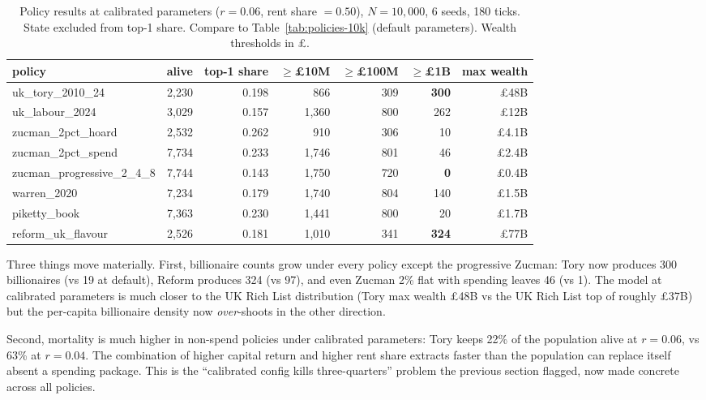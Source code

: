 \documentclass[11pt]{article}
\begin{document}
\begin{table}[t]
\centering
\small
\caption{Policy results at calibrated parameters ($r=0.06$, rent
share $=0.50$), $N=10{,}000$, 6 seeds, 180 ticks. State excluded
from top-1 share. Compare to Table~\ref{tab:policies-10k}
(default parameters). Wealth thresholds in \pounds.}
\label{tab:policies-calibrated}
\begin{tabular}{lrrrrrr}
\toprule
policy & alive & top-1 share & $\geq$\pounds10M & $\geq$\pounds100M & $\geq$\pounds1B & max wealth \\
\midrule
uk\_tory\_2010\_24 & 2{,}230 & 0.198 & 866 & 309 & \textbf{300} & \pounds48B \\
uk\_labour\_2024 & 3{,}029 & 0.157 & 1{,}360 & 800 & 262 & \pounds12B \\
zucman\_2pct\_hoard & 2{,}532 & 0.262 & 910 & 306 & 10 & \pounds4.1B \\
zucman\_2pct\_spend & 7{,}734 & 0.233 & 1{,}746 & 801 & 46 & \pounds2.4B \\
zucman\_progressive\_2\_4\_8 & 7{,}744 & 0.143 & 1{,}750 & 720 & \textbf{0} & \pounds0.4B \\
warren\_2020 & 7{,}234 & 0.179 & 1{,}740 & 804 & 140 & \pounds1.5B \\
piketty\_book & 7{,}363 & 0.230 & 1{,}441 & 800 & 20 & \pounds1.7B \\
reform\_uk\_flavour & 2{,}526 & 0.181 & 1{,}010 & 341 & \textbf{324} & \pounds77B \\
\bottomrule
\end{tabular}
\end{table}

Three things move materially. First, billionaire counts grow under
every policy except the progressive Zucman: Tory now produces 300
billionaires (vs 19 at default), Reform produces 324 (vs 97), and
even Zucman 2\% flat with spending leaves 46 (vs 1). The model at
calibrated parameters is much closer to the UK Rich List
distribution (Tory max wealth \pounds48B vs the UK Rich List top of
roughly \pounds37B) but the per-capita billionaire density now
\emph{over}-shoots in the other direction.

Second, mortality is much higher in non-spend policies under
calibrated parameters: Tory keeps 22\% of the population alive at
$r=0.06$, vs 63\% at $r=0.04$. The combination of higher capital
return and higher rent share extracts faster than the population
can replace itself absent a spending package. This is the
``calibrated config kills three-quarters'' problem the previous
section flagged, now made concrete across all policies.
\end{document}
